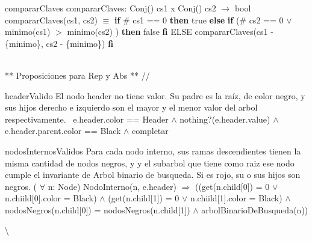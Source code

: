 \begin{DoxyParagraph}{comparar\+Claves}
comparar\+Claves\+: Conj() cs1 x Conj() cs2 $\to$ bool~\newline
 comparar\+Claves(cs1, cs2) $\equiv$ {\bfseries if} \# cs1 == 0 {\bfseries then} true {\bfseries else} {\bfseries if} (\# cs2 == 0 $\lor$ minimo(cs1) $>$ minimo(cs2) ) {\bfseries then} false {\bfseries fi} E\+L\+SE comparar\+Claves(cs1 -\/ \{minimo\}, cs2 -\/ \{minimo\}) {\bfseries fi} 
\end{DoxyParagraph}


\begin{DoxyVerb}\\ ** Proposiciones para Rep y Abs ** //
\end{DoxyVerb}


\begin{DoxyParagraph}{header\+Valido}
El nodo header no tiene valor. Su padre es la raíz, de color negro, y sus hijos derecho e izquierdo son el mayor y el menor valor del arbol respectivamente.~\newline
 e.\+header.\+color == Header $\land$ nothing?(e.\+header.\+value) $\land$ e.\+header.\+parent.\+color == Black $\land$ completar 
\end{DoxyParagraph}


\begin{DoxyParagraph}{nodos\+Internos\+Validos}
Para cada nodo interno, sus ramas descendientes tienen la misma cantidad de nodos negros, y y el subarbol que tiene como raiz ese nodo cumple el invariante de Arbol binario de busqueda. Si es rojo, su o sus hijos son negros. ( $\forall$ n\+: Node) Nodo\+Interno(n, e.\+header) $\Rightarrow$ ((get(n.\+child\mbox{[}0\mbox{]}) = 0 $\lor$ n.\+chiild\mbox{[}0\mbox{]}.color = Black) $\land$ (get(n.\+child\mbox{[}1\mbox{]}) = 0 $\lor$ n.\+chiild\mbox{[}1\mbox{]}.color = Black) $\land$ nodos\+Negros(n.\+child\mbox{[}0\mbox{]}) = nodos\+Negros(n.\+child\mbox{[}1\mbox{]}) $\land$ arbol\+Binario\+De\+Busqueda(n)) 
\end{DoxyParagraph}


\textbackslash{}

